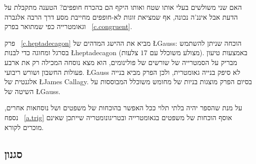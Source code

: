האם שני משולשים בעלי אותו שטח ואותו היקף הם בהכרח חופפים? הטענה מתקבלת על הדעת אבל איננ’ה נכונה, אף שמציאת זוגות לא-חופפים מחייבת מסע דרך הרבה אלגברה וגאומטרייה כפי שמתואר בפרק~%
\ref{c.congruent}.


פרק~%
\ref{c.heptadecagon}
מביא את ההישג המדהים של 
\L{Gauss}:
הוכחה שניתן להשתמש בסרגל ומחוגה כדי לבנות 
\L{heptadecagon}
(מצולע משוכלל עם $17$ צלעות). באמצעות טיעון מבריק על הסמטרייה של שורשים של פולינומים, הוא מצא נוסחה המכילה רק את ארבע פעולות החשבון ושורש ריבועי. 
\L{Gauss}
לא סיפק בנייה גאומטרית, ולכן הפרק מביא בנייה אלגנטית של 
\L{James Callagy}.
בסיום הפרק מוצגות בניות של מחומש משוכלל המבוססות על השיטה של
\L{Gauss}.



 על מנת שהספר יהיה בלתי תלוי ככל האפשר בהוכחות של משפטים ושל נוסחאות אחרים, נספח%
~\ref{a.trig}
אוסף הוכחות של משפטים בגאומטרייה ובטריגונומטריה שייתכן שאינם מוכרים לקורא.


\subsection*{סגנון}

